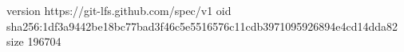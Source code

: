version https://git-lfs.github.com/spec/v1
oid sha256:1df3a9442be18bc77bad3f46c5e5516576c11cdb3971095926894e4cd14dda82
size 196704
